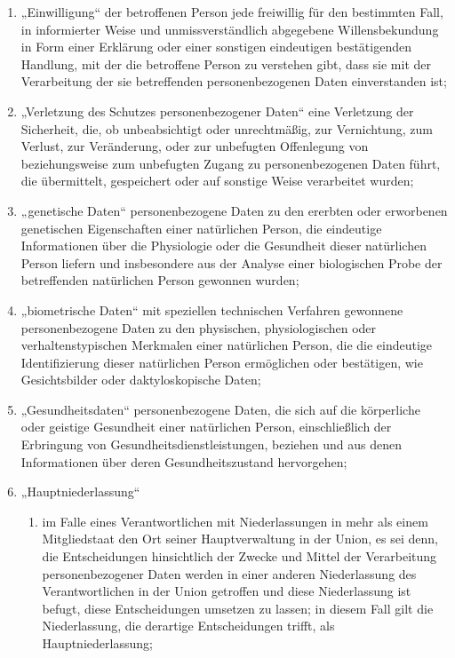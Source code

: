 \begin{enumerate}
  \item „Einwilligung“ der betroffenen Person jede freiwillig für den bestimmten Fall, in informierter Weise und
   unmissverständlich abgegebene Willensbekundung in Form einer Erklärung oder einer sonstigen eindeutigen
   bestätigenden Handlung, mit der die betroffene Person zu verstehen gibt, dass sie mit der Verarbeitung der sie
   betreffenden personenbezogenen Daten einverstanden ist;

  \item „Verletzung des Schutzes personenbezogener Daten“ eine Verletzung der Sicherheit, die, ob unbeabsichtigt oder
   unrechtmäßig, zur Vernichtung, zum Verlust, zur Veränderung, oder zur unbefugten Offenlegung von beziehungsweise zum
   unbefugten Zugang zu personenbezogenen Daten führt, die übermittelt, gespeichert oder auf sonstige Weise verarbeitet
   wurden;

  \item „genetische Daten“ personenbezogene Daten zu den ererbten oder erworbenen genetischen Eigenschaften einer
   natürlichen Person, die eindeutige Informationen über die Physiologie oder die Gesundheit dieser natürlichen Person
   liefern und insbesondere aus der Analyse einer biologischen Probe der betreffenden natürlichen Person gewonnen
   wurden;

  \item „biometrische Daten“ mit speziellen technischen Verfahren gewonnene personenbezogene Daten zu den physischen,
   physiologischen oder verhaltenstypischen Merkmalen einer natürlichen Person, die die eindeutige Identifizierung
   dieser natürlichen Person ermöglichen oder bestätigen, wie Gesichtsbilder oder daktyloskopische Daten;

  \item „Gesundheitsdaten“ personenbezogene Daten, die sich auf die körperliche oder geistige Gesundheit einer
   natürlichen Person, einschließlich der Erbringung von Gesundheitsdienstleistungen, beziehen und aus denen
   Informationen über deren Gesundheitszustand hervorgehen;

  \item „Hauptniederlassung“

  \begin{enumerate}
  
    \item im Falle eines Verantwortlichen mit Niederlassungen in mehr als einem Mitgliedstaat den Ort seiner
     Hauptverwaltung in der Union, es sei denn, die Entscheidungen hinsichtlich der Zwecke und Mittel der Verarbeitung
     personenbezogener Daten werden in einer anderen Niederlassung des Verantwortlichen in der Union getroffen und
     diese Niederlassung ist befugt, diese Entscheidungen umsetzen zu lassen; in diesem Fall gilt die Niederlassung,
     die derartige Entscheidungen trifft, als Hauptniederlassung;


\end{enumerate}
\end{enumerate}
